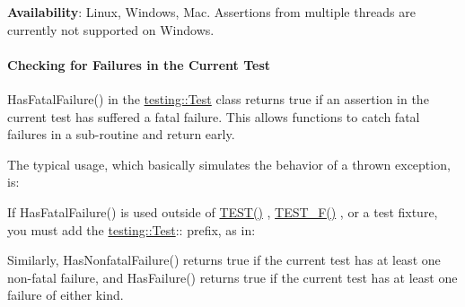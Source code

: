 {\bfseries{Availability}}\+: Linux, Windows, Mac. Assertions from multiple threads are currently not supported on Windows.

\paragraph*{Checking for Failures in the Current Test}

{\ttfamily Has\+Fatal\+Failure()} in the {\ttfamily \mbox{\hyperlink{classtesting_1_1Test}{testing\+::\+Test}}} class returns {\ttfamily true} if an assertion in the current test has suffered a fatal failure. This allows functions to catch fatal failures in a sub-\/routine and return early.


\begin{DoxyCode}{0}
\DoxyCodeLine{\};}
\end{DoxyCode}


The typical usage, which basically simulates the behavior of a thrown exception, is\+:


\begin{DoxyCode}{0}
\DoxyCodeLine{}
\DoxyCodeLine{\}}
\end{DoxyCode}


If {\ttfamily Has\+Fatal\+Failure()} is used outside of {\ttfamily \mbox{\hyperlink{gtest_8h_ad8b332753515c0ab8baada563c2547eb}{T\+E\+S\+T()}}} , {\ttfamily \mbox{\hyperlink{gtest_8h_a0ee66d464d1a06c20c1929cae09d8758}{T\+E\+S\+T\+\_\+\+F()}}} , or a test fixture, you must add the {\ttfamily \mbox{\hyperlink{classtesting_1_1Test}{testing\+::\+Test}}\+:\+:} prefix, as in\+:


\begin{DoxyCode}{0}
\end{DoxyCode}


Similarly, {\ttfamily Has\+Nonfatal\+Failure()} returns {\ttfamily true} if the current test has at least one non-\/fatal failure, and {\ttfamily Has\+Failure()} returns {\ttfamily true} if the current test has at least one failure of either kind.

